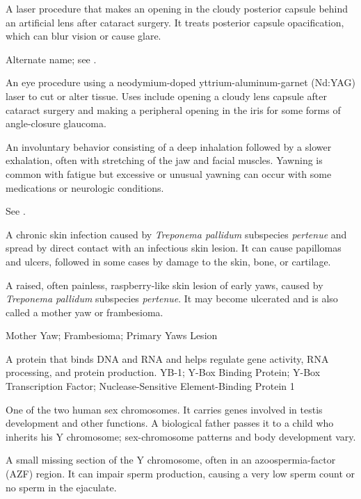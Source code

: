  A laser procedure that makes an opening in the cloudy posterior capsule behind an artificial lens after cataract surgery. It treats posterior capsule opacification, which can blur vision or cause glare.

 Alternate name; see .

 An eye procedure using a neodymium-doped yttrium-aluminum-garnet (Nd:YAG) laser to cut or alter tissue. Uses include opening a cloudy lens capsule after cataract surgery and making a peripheral opening in the iris for some forms of angle-closure glaucoma.

 An involuntary behavior consisting of a deep inhalation followed by a slower exhalation, often with stretching of the jaw and facial muscles. Yawning is common with fatigue but excessive or unusual yawning can occur with some medications or neurologic conditions.

 See .

 A chronic skin infection caused by \textit{Treponema pallidum} subspecies \textit{pertenue} and spread by direct contact with an infectious skin lesion. It can cause papillomas and ulcers, followed in some cases by damage to the skin, bone, or cartilage.

 A raised, often painless, raspberry-like skin lesion of early yaws, caused by \textit{Treponema pallidum} subspecies \textit{pertenue}. It may become ulcerated and is also called a mother yaw or frambesioma.

\synonyms
Mother Yaw; Frambesioma; Primary Yaws Lesion

 A protein that binds DNA and RNA and helps regulate gene activity, RNA processing, and protein production.
\synonyms
YB-1; Y-Box Binding Protein; Y-Box Transcription Factor; Nuclease-Sensitive Element-Binding Protein 1

 One of the two human sex chromosomes. It carries genes involved in testis development and other functions. A biological father passes it to a child who inherits his Y chromosome; sex-chromosome patterns and body development vary.

 A small missing section of the Y chromosome, often in an azoospermia-factor (AZF) region. It can impair sperm production, causing a very low sperm count or no sperm in the ejaculate.

